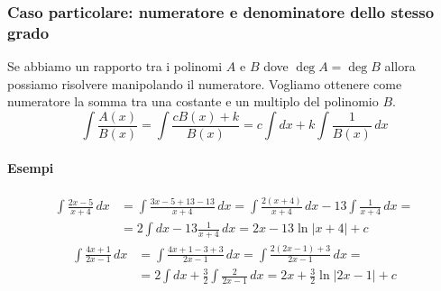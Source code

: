 \documentclass[11pt]{article}
\begin{document}
\subsubsection{Caso particolare: numeratore e denominatore dello stesso grado}
Se abbiamo un rapporto tra i polinomi $A$ e $B$ dove $\deg A = \deg B$ allora possiamo risolvere manipolando il numeratore. Vogliamo ottenere come numeratore la somma tra una costante e un multiplo del polinomio $B$. 
\[\int \frac{A(x)}{B(x)}=\int \frac{c B(x) + k}{B(x)}=c\int dx + k\int\frac{1}{B(x)}\,dx\]
\paragraph{Esempi}
\begin{align*}\int \frac{2x-5}{x+4}\,dx&=\int \frac{3x-5+13-13}{x+4}\,dx=\int\frac{2(x+4)}{x+4}\,dx-13\int \frac{1}{x+4}\,dx=\\&=2\int dx -13 \frac{1}{x+4}\,dx=2x-13\ln|x+4|+c\end{align*}
\begin{align*}\int \frac{4x+1}{2x-1}\,dx&=\int \frac{4x+1-3+3}{2x-1}\,dx=\int \frac{2(2x-1)+3}{2x-1}\,dx=\\&=2\int dx + \frac{3}{2}\int \frac{2}{2x-1}\,dx=2x+\frac{3}{2}\ln|2x-1|+c\end{align*}


%
%
\end{document}
